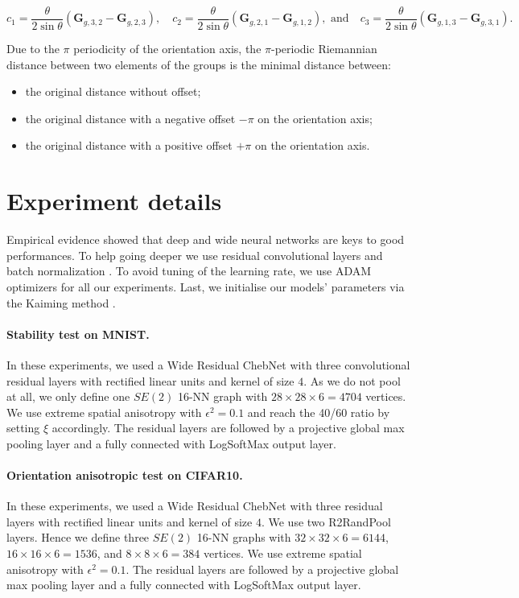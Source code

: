 \documentclass{article}
\begin{document}
\begin{equation}
c_1 = \frac{\theta}{2 \sin \theta} ( \boldsymbol{G}_{g, 3, 2} - \boldsymbol{G}_{g, 2, 3})
, \quad
c_2 = \frac{\theta}{2 \sin \theta} ( \boldsymbol{G}_{g, 2, 1} - \boldsymbol{G}_{g, 1, 2})
, \text{ and} \quad
c_3 = \frac{\theta}{2 \sin \theta} ( \boldsymbol{G}_{g, 1, 3} - \boldsymbol{G}_{g, 3, 1}).
\end{equation}

Due to the $\pi$ periodicity of the orientation axis, the $\pi$-periodic Riemannian distance between two elements of the groups is the minimal distance between:
\begin{itemize}
\item the original distance without offset;
\item the original distance with a negative offset $-\pi$ on the orientation axis;
\item the original distance with a positive offset $+\pi$ on the orientation axis.
\end{itemize}

\section{Experiment details} \label{app:experiment_details}

Empirical evidence showed that deep and wide neural networks are keys to good performances. To help going deeper we use residual convolutional layers \citep{he2016deep} and batch normalization \citep{ioffe2015batch}. To avoid tuning of the learning rate, we use ADAM optimizers \citep{kingma2014adam} for all our experiments. Last, we initialise our models' parameters via the Kaiming method \citep{he2015delving}.

\paragraph{Stability test on MNIST.} In these experiments, we used a Wide Residual ChebNet with three convolutional residual layers with rectified linear units and kernel of size $4$. As we do not pool at all, we only define one $SE(2)$ 16-NN graph with $28 \times 28 \times 6 = 4704$ vertices. We use extreme spatial anisotropy with $\epsilon^2 = 0.1$ and reach the 40/60 ratio by setting $\xi$ accordingly. The residual layers are followed by a projective global max pooling layer and a fully connected with LogSoftMax output layer.

\paragraph{Orientation anisotropic test on CIFAR10.} In these experiments, we used a Wide Residual ChebNet with three residual layers with rectified linear units and kernel of size $4$. We use two R2RandPool layers. Hence we define three $SE(2)$ 16-NN graphs with $32 \times 32 \times 6= 6144$, $16 \times 16 \times 6 = 1536$, and $8 \times 8 \times 6 = 384$ vertices. We use extreme spatial anisotropy with $\epsilon^2 = 0.1$. The residual layers are followed by a projective global max pooling layer and a fully connected with LogSoftMax output layer.
\end{document}
